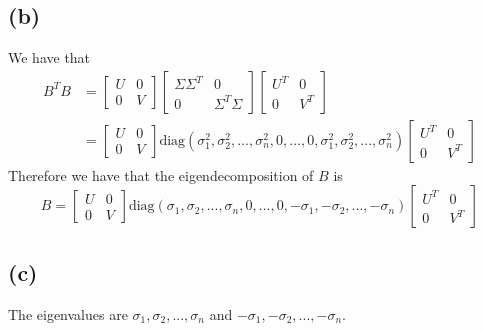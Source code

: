 \documentclass[11pt]{article}
\begin{document}
\subsection*{(b)}
We have that 
\begin{align*}
    B^TB &= \begin{bmatrix}
        U & 0\\
        0 & V
    \end{bmatrix}
    \begin{bmatrix}
        \Sigma\Sigma^T & 0\\
        0 & \Sigma^T\Sigma
    \end{bmatrix}\begin{bmatrix}
        U^T & 0\\
        0 & V^T
    \end{bmatrix}\\
    &=\begin{bmatrix}
        U & 0\\
        0 & V
    \end{bmatrix}
    \text{diag}(\sigma_1^2, \sigma_2^2,...,\sigma_n^2,0,...,0,
    \sigma_1^2, \sigma_2^2,...,\sigma_n^2)\begin{bmatrix}
        U^T & 0\\
        0 & V^T
    \end{bmatrix}
\end{align*}
Therefore we have that the eigendecomposition of $B$ is
$$B = \begin{bmatrix}
    U & 0\\
    0 & V
\end{bmatrix}
\text{diag}(\sigma_1, \sigma_2,...,\sigma_n,0,...,0,
-\sigma_1, -\sigma_2,...,-\sigma_n)
\begin{bmatrix}
    U^T & 0\\
    0 & V^T
\end{bmatrix}$$
\subsection*{(c)}
The eigenvalues are $\sigma_1, \sigma_2,...,\sigma_n$ and $-\sigma_1, -\sigma_2,...,-\sigma_n$.  
\end{document}
